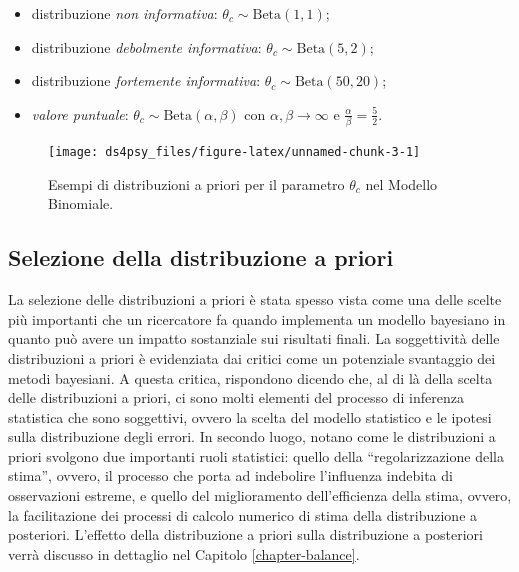 \documentclass[
  11pt,
]{krantz}
\providecommand{\tightlist}{%
  \setlength{\itemsep}{0pt}\setlength{\parskip}{0pt}}
\theoremstyle{definition}
\theoremstyle{definition}
\theoremstyle{definition}
\theoremstyle{definition}
\theoremstyle{remark}
\begin{document}
\begin{itemize}
\tightlist
\item
  distribuzione \emph{non informativa}: \(\theta_c \sim \mbox{Beta}(1,1)\);
\item
  distribuzione \emph{debolmente informativa}: \(\theta_c \sim \mbox{Beta}(5,2)\);
\item
  distribuzione \emph{fortemente informativa}: \(\theta_c \sim \mbox{Beta}(50,20)\);
\item
  \emph{valore puntuale}: \(\theta_c \sim \mbox{Beta}(\alpha, \beta)\) con \(\alpha, \beta \rightarrow \infty\) e \(\frac{\alpha}{\beta} = \frac{5}{2}\).
\end{itemize}

\begin{figure}[h]

{\centering \texttt{[image: ds4psy\_files/figure-latex/unnamed-chunk-3-1]} 

}

\caption{Esempi di distribuzioni a priori per il parametro $\theta_c$ nel Modello Binomiale.}\label{fig:unnamed-chunk-3}
\end{figure}

\hypertarget{selezione-della-distribuzione-a-priori}{%
\subsection{Selezione della distribuzione a priori}\label{selezione-della-distribuzione-a-priori}}

La selezione delle distribuzioni a priori è stata spesso vista come una delle scelte più importanti che un ricercatore fa quando implementa un modello bayesiano in quanto può avere un impatto sostanziale sui risultati finali. La soggettività delle distribuzioni a priori è evidenziata dai critici come un potenziale svantaggio dei metodi bayesiani. A questa critica, \citet{vandeSchoot2021modelling} rispondono dicendo che, al di là della scelta delle distribuzioni a priori, ci sono molti elementi del processo di inferenza statistica che sono soggettivi, ovvero la scelta del modello statistico e le ipotesi sulla distribuzione degli errori. In secondo luogo, \citet{vandeSchoot2021modelling} notano come le distribuzioni a priori svolgono due importanti ruoli statistici: quello della ``regolarizzazione della stima'', ovvero, il processo che porta ad indebolire l'influenza indebita di osservazioni estreme, e quello del miglioramento dell'efficienza della stima, ovvero, la facilitazione dei processi di calcolo numerico di stima della distribuzione a posteriori. L'effetto della distribuzione a priori sulla distribuzione a posteriori verrà discusso in dettaglio nel Capitolo \ref{chapter-balance}.
\end{document}

